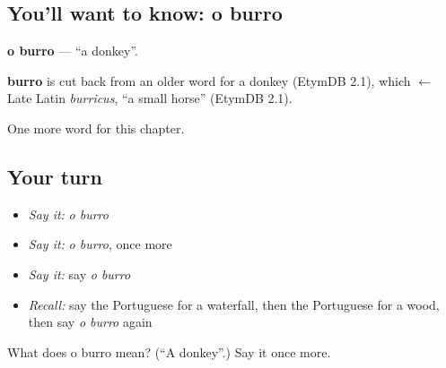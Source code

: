 \subsection*{You'll want to know: o burro}
\textbf{o burro} — \textquotedblleft{}a donkey\textquotedblright{}.

\begin{cousinweb}
\textbf{burro} is cut back from an older word for a donkey (EtymDB 2.1), which $\leftarrow$ Late Latin \emph{burricus}, \textquotedblleft{}a small horse\textquotedblright{} (EtymDB 2.1).
\end{cousinweb}

\begin{grammarlens}[title={What you've built}]
One more word for this chapter.
\end{grammarlens}

\subsection*{Your turn}
\begin{itemize}
\raggedright
  \item \emph{Say it:} \emph{o burro}
  \item \emph{Say it:} \emph{o burro}, once more
  \item \emph{Say it:} say \emph{o burro}
  \item \emph{Recall:} say the Portuguese for a waterfall, then the Portuguese for a wood, then say \emph{o burro} again
\end{itemize}

\begin{tcolorbox}[breakable,colback=teal!4,colframe=teal!35!black,title={Before you move on}]
What does o burro mean? (\textquotedblleft{}A donkey\textquotedblright{}.) Say it once more.
\end{tcolorbox}
